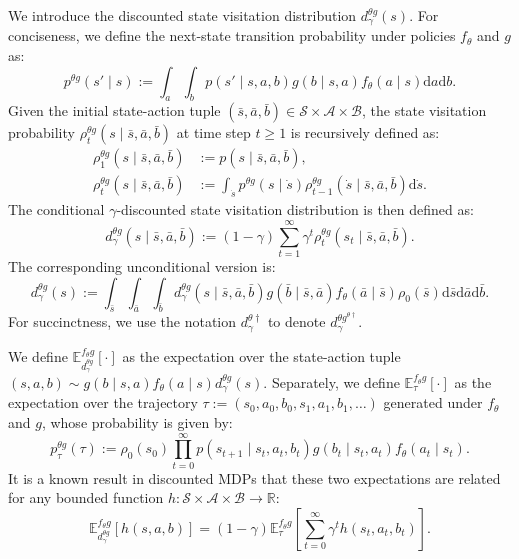 \documentclass[letterpaper]{article} %
\providecommand{\R}{\mathbb{R}} %
\providecommand{\E}{\mathbb{E}} %
\providecommand{\rmd}{\mathrm{d}} %
\renewcommand{\geq}{\geqslant} %
\begin{document}
We introduce the discounted state visitation distribution $d_{\gamma}^{\theta g}(s)$.
For conciseness, we define the next-state transition probability under policies $f_\theta$ and $g$ as:
\begin{equation}
    p^{\theta g}(s' \mid s) := \int_{a}\int_{b} p(s'\mid s, a, b) g(b \mid s, a) f_{\theta}(a \mid s) \rmd a \rmd b .
\end{equation}
Given the initial state-action tuple $(\bar{s}, \bar{a}, \bar{b}) \in \mathcal{S}\times\mathcal{A}\times\mathcal{B}$, the state visitation probability $\rho_t^{\theta g}(s\mid \bar{s},\bar{a},\bar{b})$ at time step $t\geq 1$ is recursively defined as:
\begin{align}
    \rho_1^{\theta g}(s\mid \bar{s},\bar{a},\bar{b}) &:= p(s\mid \bar{s},\bar{a},\bar{b}),\\
    \rho_t^{\theta g}(s\mid \bar{s},\bar{a},\bar{b}) &:= \int_{\dot{s}} p^{\theta g}(s\mid \dot{s}) \rho_{t-1}^{\theta g}(\dot{s}\mid \bar{s},\bar{a},\bar{b}) \rmd \dot{s} .
\end{align}
The conditional $\gamma$-discounted state visitation distribution is then defined as: 
\begin{equation}
    d_\gamma^{\theta g}(s\mid\bar{s}, \bar{a}, \bar{b}) := (1 - \gamma) \sum_{t=1}^{\infty} \gamma^{t} \rho_t^{\theta g}(s_t\mid\bar{s}, \bar{a}, \bar{b}).
\end{equation}
The corresponding unconditional version is: 
\begin{equation}
    d_\gamma^{\theta g}(s) := \int_{\bar{s}}\int_{\bar{a}}\int_{\bar{b}} d_\gamma^{\theta g}(s\mid\bar{s}, \bar{a}, \bar{b}) 
    g(\bar{b}\mid\bar{s},\bar{a})f_{\theta}(\bar{a}\mid\bar{s})\rho_0(\bar{s})  \rmd \bar{s} \rmd \bar{a} \rmd \bar{b}.
\end{equation}
For succinctness, we use the notation $d_\gamma^{\theta \dag}$ to denote $d_\gamma^{\theta g^{\theta\dagger}}$.

We define $\E_{d_{\gamma}^{\theta g}}^{f_{\theta}g}[\cdot]$ as the expectation over the state-action tuple $(s,a,b)\sim g(b\mid s,a)f_{\theta}(a\mid s)d_{\gamma}^{\theta g}(s)$. Separately, we define $\E_\tau^{f_{\theta}g}[\cdot]$ as the expectation over the trajectory $\tau:=(s_0,a_0,b_0,s_1,a_1,b_1,\dots)$ generated under $f_{\theta}$ and $g$, whose probability is given by:
\begin{equation}
    p_\tau^{{\theta} {g}}(\tau) := \rho_0(s_0) \prod_{t=0}^{\infty} p(s_{t+1} \mid s_{t}, a_{t}, b_{t}) g(b_{t}\mid s_{t}, a_{t}) f_{{\theta}}(a_{t}\mid s_{t}).
\end{equation}
It is a known result in discounted MDPs that these two expectations are related for any bounded function $h:\mathcal{S}\times\mathcal{A}\times\mathcal{B}\to\R$:
\begin{equation}
    \E_{d_{\gamma}^{\theta g}}^{f_{\theta}g}\left[h(s,a,b)\right]=(1-\gamma)\E_\tau^{f_{\theta}g}\left[\sum_{t=0}^\infty\gamma^t h(s_t,a_t,b_t)\right].
\end{equation}
\end{document}
